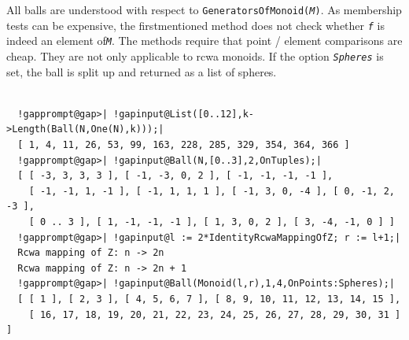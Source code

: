 \documentclass[a4paper,11pt]{report}
\begin{document}
{{{ All balls are understood with respect to \texttt{GeneratorsOfMonoid(\mbox{\texttt{\mdseries\slshape M}})}. As membership tests can be expensive, the first\texttt{}mentioned
method does not check whether \mbox{\texttt{\mdseries\slshape f}} is indeed an element of{\nobreakspace}\mbox{\texttt{\mdseries\slshape M}}. The methods require that point\texttt{} / element comparisons are
cheap. They are not only applicable to rcwa monoids. If the option \mbox{\texttt{\mdseries\slshape Spheres}} is set, the ball is split up and returned as a list of spheres. 
\begin{Verbatim}[commandchars=!@|,fontsize=\small,frame=single,label=Example]
  
  !gapprompt@gap>| !gapinput@List([0..12],k->Length(Ball(N,One(N),k)));|
  [ 1, 4, 11, 26, 53, 99, 163, 228, 285, 329, 354, 364, 366 ]
  !gapprompt@gap>| !gapinput@Ball(N,[0..3],2,OnTuples);|
  [ [ -3, 3, 3, 3 ], [ -1, -3, 0, 2 ], [ -1, -1, -1, -1 ], 
    [ -1, -1, 1, -1 ], [ -1, 1, 1, 1 ], [ -1, 3, 0, -4 ], [ 0, -1, 2, -3 ], 
    [ 0 .. 3 ], [ 1, -1, -1, -1 ], [ 1, 3, 0, 2 ], [ 3, -4, -1, 0 ] ]
  !gapprompt@gap>| !gapinput@l := 2*IdentityRcwaMappingOfZ; r := l+1;|
  Rcwa mapping of Z: n -> 2n
  Rcwa mapping of Z: n -> 2n + 1
  !gapprompt@gap>| !gapinput@Ball(Monoid(l,r),1,4,OnPoints:Spheres);|
  [ [ 1 ], [ 2, 3 ], [ 4, 5, 6, 7 ], [ 8, 9, 10, 11, 12, 13, 14, 15 ], 
    [ 16, 17, 18, 19, 20, 21, 22, 23, 24, 25, 26, 27, 28, 29, 30, 31 ] ]
  
\end{Verbatim}
 }

  }

  }

       
\end{document}
